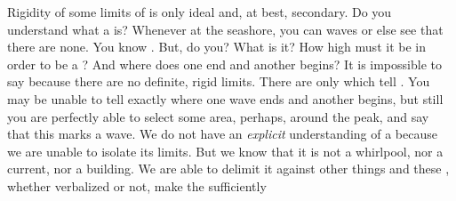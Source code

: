 \pa Rigidity of some limits of  is only ideal and, at best,
secondary.  Do you understand what a  is?  Whenever at the seashore,
you can  waves or else see that there are none.  You know
.  But, do you?  What is it?  How high must it be in
order to be a ?  And where does one  end and another begins?
It is impossible to say because there are no definite, rigid limits.  There are
only  which tell .  You
may be unable to tell exactly where one wave ends and another begins, but still
you are perfectly able to select some area, perhaps, around the peak, and say
that this marks a wave. We do not have an {\em explicit} understanding of a
 because we are unable to isolate  its limits.  But
we know that it is not a whirlpool, nor a current, nor a building.  We are able
to delimit it against other things and these , whether
verbalized or not, make the   sufficiently
